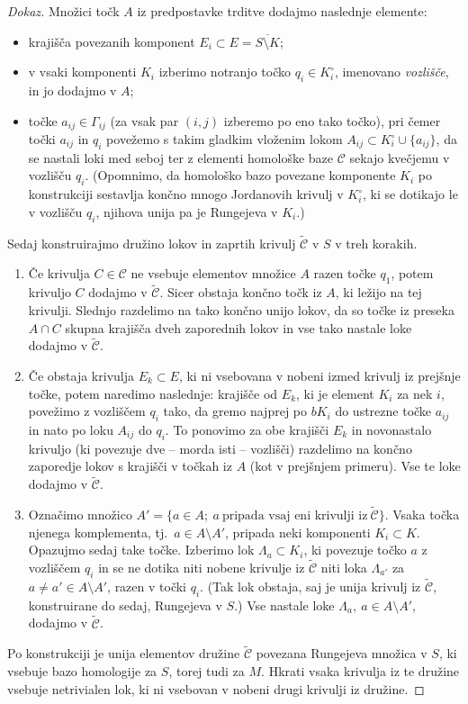 \documentclass[12pt,a4paper,twoside]{article}
\theoremstyle{definition} %
\newenvironment{dokaz}[1][Dokaz]{\begin{proof}[#1]}{\end{proof}}
\theoremstyle{plain} %
\numberwithin{equation}{section}  %
\begin{document}
\begin{dokaz}
Množici točk $A$ iz predpostavke trditve dodajmo naslednje elemente:
\begin{itemize}
\item krajišča povezanih komponent $E_{i} \subset E = \overline{S \setminus K}$;
\item v vsaki komponenti $K_{i}$ izberimo notranjo točko $q_{i} \in K_{i}^{\circ}$, imenovano \emph{vozlišče}, in jo dodajmo v $A$;
\item točke $a_{ij} \in \Gamma_{ij}$ (za vsak par $(i,j)$ izberemo po eno tako točko), pri čemer točki $a_{ij}$ in $q_{i}$ povežemo s takim gladkim vloženim lokom $A_{ij} \subset K_{i}^{\circ} \cup \{a_{ij}\}$, da se nastali loki med seboj ter z elementi homološke baze $\mathcal{C}$ sekajo kvečjemu v vozlišču $q_{i}$. (Opomnimo, da homološko bazo povezane komponente $K_{i}$ po konstrukciji sestavlja končno mnogo Jordanovih krivulj v $K_{i}^{\circ}$, ki se dotikajo le v vozlišču $q_{i}$, njihova unija pa je Rungejeva v $K_{i}$.)
\end{itemize}
Sedaj konstruirajmo družino lokov in zaprtih krivulj $\widetilde{\mathcal{C}}$ v $S$ v treh korakih.
\begin{enumerate}
\item
	Če krivulja $C \in \mathcal{C}$ ne vsebuje elementov množice $A$ razen točke $q_{1}$, potem krivuljo $C$ dodajmo v $\widetilde{\mathcal{C}}$.
	Sicer obstaja končno točk iz $A$, ki ležijo na tej krivulji. Slednjo razdelimo na tako končno unijo lokov, da so točke iz preseka $A \cap C$ skupna krajišča dveh zaporednih lokov in vse tako nastale loke dodajmo v $\widetilde{\mathcal{C}}$.
\item
	Če obstaja krivulja $E_{k} \subset E$, ki ni vsebovana v nobeni izmed krivulj iz prejšnje točke, potem naredimo naslednje:
	krajišče od $E_{k}$, ki je element $K_{i}$ za nek $i$, povežimo z vozliščem $q_{i}$ tako, da gremo najprej po $bK_{i}$ do ustrezne točke $a_{ij}$ in nato po loku $A_{ij}$ do $q_{i}$. To ponovimo za obe krajišči $E_{k}$ in novonastalo krivuljo (ki povezuje dve -- morda isti -- vozlišči) razdelimo na končno zaporedje lokov s krajišči v točkah iz $A$ (kot v prejšnjem primeru). Vse te loke dodajmo v $\widetilde{\mathcal{C}}$.
\item
	Označimo množico $A' = \{ a \in A; \ a \ \textrm{pripada vsaj eni krivulji iz} \ \widetilde{\mathcal{C}}\}$.
	Vsaka točka njenega komplementa, tj.~$a \in A \setminus A'$, pripada neki komponenti $K_{i} \subset K$. Opazujmo sedaj take točke.
	Izberimo lok $\Lambda_{a} \subset K_{i}$, ki povezuje točko $a$ z vozliščem $q_{i}$ in se ne dotika niti nobene krivulje iz $\widetilde{\mathcal{C}}$ niti loka $\Lambda_{a'}$ za $a \neq a' \in A \setminus A'$, razen v točki $q_{i}$. (Tak lok obstaja, saj je unija krivulj iz $\widetilde{\mathcal{C}}$, konstruirane do sedaj, Rungejeva v $S$.) Vse nastale loke $\Lambda_{a}, \ a \in A \setminus A'$, dodajmo v $\widetilde{\mathcal{C}}$.
\end{enumerate}
Po konstrukciji je unija elementov družine $\widetilde{\mathcal{C}}$ povezana Rungejeva množica v $S$, ki vsebuje bazo homologije za $S$, torej tudi za $M$. Hkrati vsaka krivulja iz te družine vsebuje netrivialen lok, ki ni vsebovan v nobeni drugi krivulji iz družine. \newline


\end{dokaz}
\end{document}
